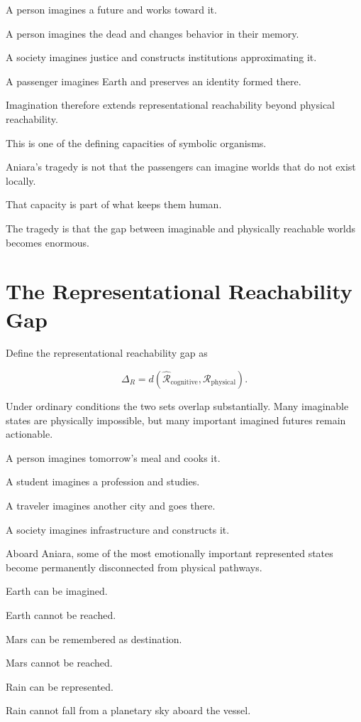 \documentclass[11pt,oneside]{book}
\theoremstyle{definition}
\theoremstyle{remark}
\newcommand{\R}{\mathcal{R}}
\begin{document}
A person imagines a future and works toward it.

A person imagines the dead and changes behavior in their memory.

A society imagines justice and constructs institutions approximating it.

A passenger imagines Earth and preserves an identity formed there.

Imagination therefore extends representational reachability beyond physical reachability.

This is one of the defining capacities of symbolic organisms.

Aniara's tragedy is not that the passengers can imagine worlds that do not exist locally.

That capacity is part of what keeps them human.

The tragedy is that the gap between imaginable and physically reachable worlds becomes enormous.

\section{The Representational Reachability Gap}

Define the representational reachability gap as

\[
\Delta_R
=
d(
\widehat{\R}_{\mathrm{cognitive}},
\R_{\mathrm{physical}}
).
\]

Under ordinary conditions the two sets overlap substantially. Many imaginable states are physically impossible, but many important imagined futures remain actionable.

A person imagines tomorrow's meal and cooks it.

A student imagines a profession and studies.

A traveler imagines another city and goes there.

A society imagines infrastructure and constructs it.

Aboard Aniara, some of the most emotionally important represented states become permanently disconnected from physical pathways.

Earth can be imagined.

Earth cannot be reached.

Mars can be remembered as destination.

Mars cannot be reached.

Rain can be represented.

Rain cannot fall from a planetary sky aboard the vessel.
\end{document}
